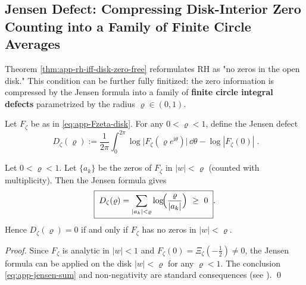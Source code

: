 \subsection{Jensen Defect: Compressing Disk-Interior Zero Counting into a Family of Finite Circle Averages}\label{subsec:unit-disk-jensen-defect}
Theorem \ref{thm:app-rh-iff-disk-zero-free} reformulates RH as "no zeros in the open disk."
This condition can be further fully finitized: the zero information is compressed by the Jensen formula into a family of \textbf{finite circle integral defects} parametrized by the radius \(\varrho\in(0,1)\).

\begin{definition}\label{def:app-jensen-defect}
Let \(F_{\zeta}\) be as in \eqref{eq:app-Fzeta-disk}.
For any \(0<\varrho<1\), define the Jensen defect
\begin{equation}\label{eq:app-jensen-defect}
\boxed{\;
D_{\zeta}(\varrho)
:=\frac{1}{2\pi}\int_{0}^{2\pi}\log\bigl|F_{\zeta}(\varrho e^{\mathrm{i}\theta})\bigr|\,\dd\theta
-\log|F_{\zeta}(0)|\; }.
\end{equation}
\end{definition}

\begin{proposition}\label{prop:app-jensen-formula-defect}
Let \(0<\varrho<1\).
Let \(\{a_k\}\) be the zeros of \(F_{\zeta}\) in \(|w|<\varrho\) (counted with multiplicity).
Then the Jensen formula gives
\begin{equation}\label{eq:app-jensen-sum}
\boxed{\;
D_{\zeta}(\varrho)
=\sum_{|a_k|<\varrho}\log\!\Bigl(\frac{\varrho}{|a_k|}\Bigr)\ \ge\ 0\; }.
\end{equation}
Hence \(D_{\zeta}(\varrho)=0\) if and only if \(F_{\zeta}\) has no zeros in \(|w|<\varrho\).
\end{proposition}
\begin{proof}
Since \(F_{\zeta}\) is analytic in \(|w|<1\) and \(F_{\zeta}(0)=\Xi_{\zeta}(-\tfrac12)\neq 0\), the Jensen formula can be applied on the disk \(|w|<\varrho\) for any \(\varrho<1\).
The conclusion \eqref{eq:app-jensen-sum} and non-negativity are standard consequences (see \cite{Duren1970TheoryHp}). \qed
\end{proof}

